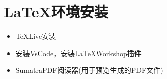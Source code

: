 \section{\LaTeX 环境安装}

\begin{itemize}
    \item \TeX Live安装
    \item 安装VsCode，安装\LaTeX Workshop插件
    \item SumatraPDF阅读器(用于预览生成的PDF文件)
\end{itemize}

